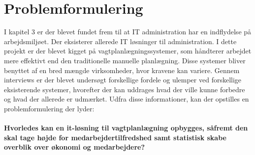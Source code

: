 


\section{Problemformulering}

I kapitel 3 er der blevet fundet frem til at IT administration har en indflydelse på arbejdsmiljøet. Der eksisterer allerede IT løsninger til administration. I dette projekt er der blevet kigget på vagtplanlægningssystemer, som håndterer arbejdet mere effektivt end den traditionelle manuelle planlægning. Disse systemer bliver benyttet af en bred mængde virksomheder, hvor kravene kan variere. Gennem interviews er der blevet undersøgt forskellige fordele og ulemper ved forskellige eksisterende systemer, hvorefter der kan uddrages hvad der ville kunne forbedre og hvad der allerede er udmærket. Udfra disse informationer, kan der opstilles en problemformulering der lyder:
\\\\
\textbf{Hvorledes kan en it-løsning til vagtplanlægning opbygges, såfremt den skal tage højde for medarbejdertilfredshed samt statistisk skabe overblik over økonomi og medarbejdere?}